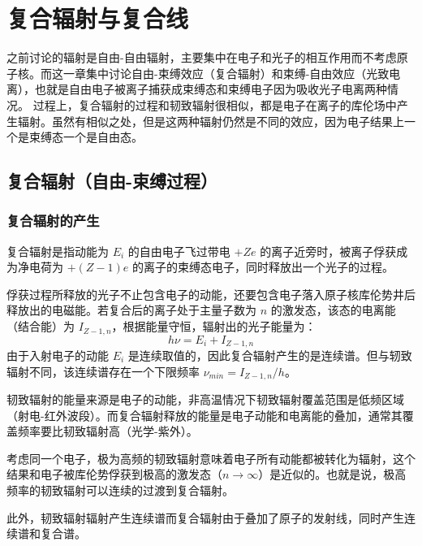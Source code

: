\chapter{复合辐射与复合线}

之前讨论的辐射是自由-自由辐射，主要集中在电子和光子的相互作用而不考虑原子核。而这一章集中讨论自由-束缚效应（复合辐射）和束缚-自由效应（光致电离），也就是自由电子被离子捕获成束缚态和束缚电子因为吸收光子电离两种情况。
过程上，复合辐射的过程和韧致辐射很相似，都是电子在离子的库伦场中产生辐射。虽然有相似之处，但是这两种辐射仍然是不同的效应，因为电子结果上一个是束缚态一个是自由态。

\section{复合辐射（自由-束缚过程）}
\subsection{复合辐射的产生}

复合辐射是指动能为 $E_i$ 的自由电子飞过带电 $+Ze$ 的离子近旁时，被离子俘获成为净电荷为 $+(Z-1)e$ 的离子的束缚态电子，同时释放出一个光子的过程。

俘获过程所释放的光子不止包含电子的动能，还要包含电子落入原子核库伦势井后释放出的电磁能。若复合后的离子处于主量子数为 $n$ 的激发态，该态的电离能（结合能）为 $I_{Z-1,n}$，根据能量守恒，辐射出的光子能量为：
\begin{equation}\label{eq:recomb_energy}
    h\nu = E_i + I_{Z-1,n}
\end{equation}
由于入射电子的动能 $E_i$ 是连续取值的，因此复合辐射产生的是连续谱。但与轫致辐射不同，该连续谱存在一个下限频率 $\nu_{min} = I_{Z-1,n}/h$。

\begin{derivationnote}
    韧致辐射的能量来源是电子的动能，非高温情况下韧致辐射覆盖范围是低频区域（射电-红外波段）。而复合辐射释放的能量是电子动能和电离能的叠加，通常其覆盖频率要比韧致辐射高（光学-紫外）。

    考虑同一个电子，极为高频的韧致辐射意味着电子所有动能都被转化为辐射，这个结果和电子被库伦势俘获到极高的激发态（$n \rightarrow \infty$）是近似的。也就是说，极高频率的韧致辐射可以连续的过渡到复合辐射。
    
    此外，韧致辐射辐射产生连续谱而复合辐射由于叠加了原子的发射线，同时产生连续谱和复合谱。
\end{derivationnote}

